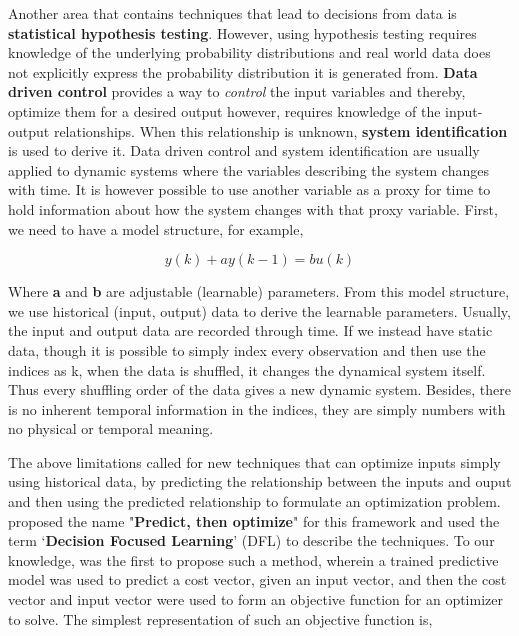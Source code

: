 \documentclass[12pt, letterpaper]{article}
\begin{document}
Another area that contains techniques that lead to decisions from data is
\textbf{statistical hypothesis testing}. However, using hypothesis testing
requires knowledge of the underlying probability distributions and real world
data does not explicitly express the probability distribution it is generated
from. \textbf{Data driven control} provides a way to \textit{control} the input
variables and thereby, optimize them for a desired output however, requires
knowledge of the input-output relationships. When this relationship is unknown,
\textbf{system identification} is used to derive it. Data driven control and
system identification are usually applied to dynamic systems where the variables
describing the system changes with time. It is however possible to use another
variable as a proxy for time to hold information about how the system changes
with that proxy variable. First, we need to have a model structure, for example,

\begin{equation}
    y(k) + ay(k-1) = bu(k)
\end{equation}

Where \textbf{a} and \textbf{b} are adjustable (learnable) parameters. From this
model structure, we use historical (input, output) data to derive the learnable
parameters. Usually, the input and output data are recorded through time. If
we instead have static data, though it is possible to simply index every observation
and then use the indices as k, when the data is shuffled, it changes the dynamical 
system itself. Thus every shuffling order of the data gives a new dynamic system.
Besides, there is no inherent temporal information in the indices, they are simply
numbers with no physical or temporal meaning.

The above limitations called for new techniques that can optimize inputs simply
using historical data, by predicting the relationship between the inputs and
ouput and then using the predicted relationship to formulate an optimization
problem. \cite{Mandi_2024} proposed the name "\textbf{Predict, then optimize}"
for this framework and used the term `\textbf{Decision Focused Learning}' (DFL) to
describe the techniques. To our knowledge, \cite{spo} was the first to propose
such a method, wherein a trained predictive model was used to predict a cost
vector, given an input vector, and then the cost vector and input vector were
used to form an objective function for an optimizer to solve. The simplest
representation of such an objective function is,
\end{document}
